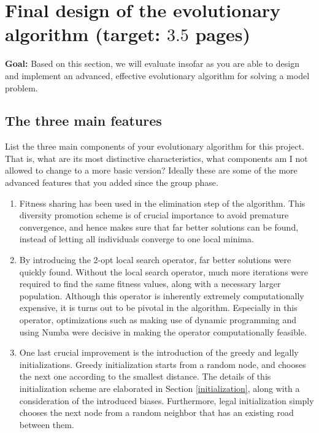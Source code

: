 \documentclass[a4paper,10pt]{article}
\newcommand{\ReplaceMe}[1]{{\color{blue}#1}}
\newcommand{\RemoveMe}[1]{{\color{purple}#1}}
\begin{document}
\section{Final design of the evolutionary algorithm (target: $3.5$ pages)} 

\RemoveMe{\textbf{Goal:} Based on this section, we will evaluate insofar as you are able to design and implement an advanced, effective evolutionary algorithm for solving a model problem.}


\subsection{The three main features}
\ReplaceMe{List the three main components of your evolutionary algorithm for this project. That is, what are its most distinctive characteristics, what components am I not allowed to change to a more basic version? Ideally these are some of the more advanced features that you added since the group phase.}

\begin{enumerate}
\item Fitness sharing has been used in the elimination step of the algorithm. This diversity promotion scheme is of crucial importance to avoid premature convergence, and hence makes sure that far better solutions can be found, instead of letting all individuals converge to one local minima.
\item By introducing the 2-opt local search operator, far better solutions were quickly found. Without the local search operator, much more iterations were required to find the same fitness values, along with a necessary larger population. Although this operator is inherently extremely computationally expensive, it is turns out to be pivotal in the algorithm. Especially in this operator, optimizations such as making use of dynamic programming and using Numba were decisive in making the operator computationally feasible.
\item One last crucial improvement is the introduction of the greedy and legally initializations. Greedy initialization starts from a random node, and chooses the next one according to the smallest distance. The details of this initialization scheme are elaborated in Section \ref{initialization}, along with a consideration of the introduced biases. Furthermore, legal initialization simply chooses the next node from a random neighbor that has an existing road between them.
\end{enumerate}
\end{document}
